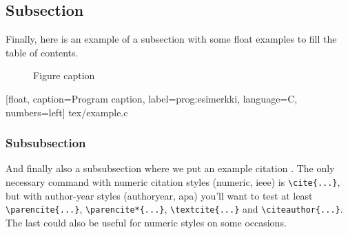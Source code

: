 \subsection{Subsection}

Finally, here is an example of a subsection with some float examples to fill the table of contents.

\begin{figure}
    \centering
    \caption{Figure caption}
\end{figure}

\begin{table}
    \centering
    \caption{Table caption}
\end{table}

\renewcommand{\lstlistingname}{Program}

    [float,
    caption={Program caption},
    label=prog:esimerkki,
    language=C,
    numbers=left]
    {tex/example.c}

\subsubsection{Subsubsection}

And finally also a subsubsection where we put an example citation \cite{somecitation}. The only necessary command with numeric citation styles (numeric, ieee) is \verb+\cite{...}+, but with author-year styles (authoryear, apa) you'll want to test at least \verb+\parencite{...}+, \verb+\parencite*{...}+, \verb+\textcite{...}+ and \verb+\citeauthor{...}+. The last could also be useful for numeric styles on some occasions.
